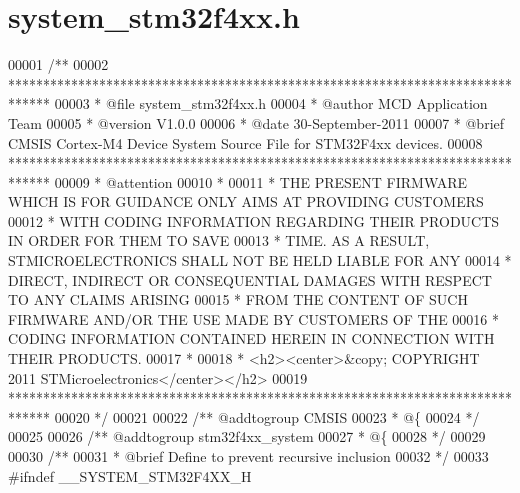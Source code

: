 \section{system\+\_\+stm32f4xx.\+h}
\label{system__stm32f4xx_8h_source}

\begin{DoxyCode}
00001 \textcolor{comment}{/**}
00002 \textcolor{comment}{  ******************************************************************************}
00003 \textcolor{comment}{  * @file    system\_stm32f4xx.h}
00004 \textcolor{comment}{  * @author  MCD Application Team}
00005 \textcolor{comment}{  * @version V1.0.0}
00006 \textcolor{comment}{  * @date    30-September-2011}
00007 \textcolor{comment}{  * @brief   CMSIS Cortex-M4 Device System Source File for STM32F4xx devices.  }
00008 \textcolor{comment}{  ******************************************************************************  }
00009 \textcolor{comment}{  * @attention}
00010 \textcolor{comment}{  *}
00011 \textcolor{comment}{  * THE PRESENT FIRMWARE WHICH IS FOR GUIDANCE ONLY AIMS AT PROVIDING CUSTOMERS}
00012 \textcolor{comment}{  * WITH CODING INFORMATION REGARDING THEIR PRODUCTS IN ORDER FOR THEM TO SAVE}
00013 \textcolor{comment}{  * TIME. AS A RESULT, STMICROELECTRONICS SHALL NOT BE HELD LIABLE FOR ANY}
00014 \textcolor{comment}{  * DIRECT, INDIRECT OR CONSEQUENTIAL DAMAGES WITH RESPECT TO ANY CLAIMS ARISING}
00015 \textcolor{comment}{  * FROM THE CONTENT OF SUCH FIRMWARE AND/OR THE USE MADE BY CUSTOMERS OF THE}
00016 \textcolor{comment}{  * CODING INFORMATION CONTAINED HEREIN IN CONNECTION WITH THEIR PRODUCTS.}
00017 \textcolor{comment}{  *}
00018 \textcolor{comment}{  * <h2><center>&copy; COPYRIGHT 2011 STMicroelectronics</center></h2>}
00019 \textcolor{comment}{  ******************************************************************************  }
00020 \textcolor{comment}{  */}
00021 
00022 \textcolor{comment}{/** @addtogroup CMSIS}
00023 \textcolor{comment}{  * @\{}
00024 \textcolor{comment}{  */}
00025 
00026 \textcolor{comment}{/** @addtogroup stm32f4xx\_system}
00027 \textcolor{comment}{  * @\{}
00028 \textcolor{comment}{  */}
00029 
00030 \textcolor{comment}{/**}
00031 \textcolor{comment}{  * @brief Define to prevent recursive inclusion}
00032 \textcolor{comment}{  */}
00033 \textcolor{preprocessor}{#}\textcolor{preprocessor}{ifndef} \textcolor{preprocessor}{\_\_SYSTEM\_STM32F4XX\_H}

\end{DoxyCode}
